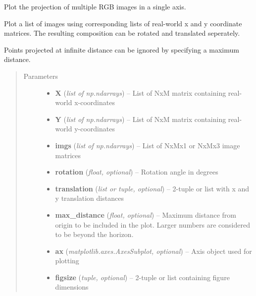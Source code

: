 \documentclass[letterpaper,10pt,english]{sphinxmanual}
\begin{document}
\begin{fulllineitems}
\label{rectification:flamingo.rectification.plot.plot_rectified}
Plot the projection of multiple RGB images in a single axis.

Plot a list of images using corresponding lists of real-world
x and y coordinate matrices. The resulting composition can be
rotated and translated seperately.

Points projected at infinite distance can be ignored by
specifying a maximum distance.
\begin{quote}\begin{description}
\item[{Parameters}] \leavevmode\begin{itemize}
\item {} 
\textbf{X} (\emph{list of np.ndarrays}) -- List of NxM matrix containing real-world x-coordinates

\item {} 
\textbf{Y} (\emph{list of np.ndarrays}) -- List of NxM matrix containing real-world y-coordinates

\item {} 
\textbf{imgs} (\emph{list of np.ndarrays}) -- List of NxMx1 or NxMx3 image matrices

\item {} 
\textbf{rotation} (\emph{float, optional}) -- Rotation angle in degrees

\item {} 
\textbf{translation} (\emph{list or tuple, optional}) -- 2-tuple or list with x and y translation distances

\item {} 
\textbf{max\_distance} (\emph{float, optional}) -- Maximum distance from origin to be included in the plot.
Larger numbers are considered to be beyond the horizon.

\item {} 
\textbf{ax} (\emph{matplotlib.axes.AxesSubplot, optional}) -- Axis object used for plotting

\item {} 
\textbf{figsize} (\emph{tuple, optional}) -- 2-tuple or list containing figure dimensions


\end{itemize}
\end{description}
\end{quote}
\end{fulllineitems}
\end{document}
